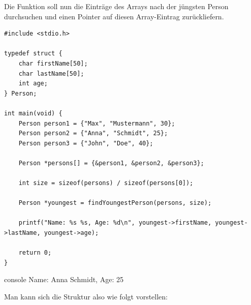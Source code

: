 Die Funktion soll nun die Einträge des Arrays nach der jüngsten Person
durchsuchen und einen Pointer auf diesen Array-Eintrag zurückliefern.

\Vorlage
\begin{verbatim}
#include <stdio.h>

typedef struct {
    char firstName[50];
    char lastName[50];
    int age;
} Person;

int main(void) {
    Person person1 = {"Max", "Mustermann", 30};
    Person person2 = {"Anna", "Schmidt", 25};
    Person person3 = {"John", "Doe", 40};

    Person *persons[] = {&person1, &person2, &person3};

    int size = sizeof(persons) / sizeof(persons[0]);

    Person *youngest = findYoungestPerson(persons, size);

    printf("Name: %s %s, Age: %d\n", youngest->firstName, youngest->lastName, youngest->age);

    return 0;
}
\end{verbatim}

\begin{mybox}[Bildschirmausgabe]{console}
Name: Anna Schmidt, Age: 25
\end{mybox}


Man kann sich die Struktur also wie folgt vorstellen:

